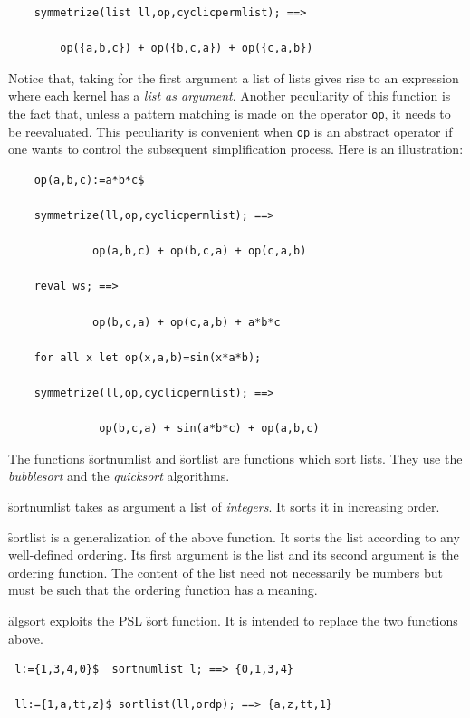 \begin{itemize}
\begin{verbatim}
    symmetrize(list ll,op,cyclicpermlist); ==>

        op({a,b,c}) + op({b,c,a}) + op({c,a,b})
\end{verbatim}
Notice that, taking for the first argument a list of lists gives rise to
an expression where  each kernel has a \emph{list as argument}. Another
peculiarity of this function is the fact that, unless a pattern matching is
made on the operator \texttt{op}, it needs to be reevaluated. This peculiarity
is convenient when \texttt{op} is an abstract operator if one wants to
control the subsequent simplification process. Here is an illustration:
\begin{verbatim}
    op(a,b,c):=a*b*c$

    symmetrize(ll,op,cyclicpermlist); ==>

             op(a,b,c) + op(b,c,a) + op(c,a,b)

    reval ws; ==>

             op(b,c,a) + op(c,a,b) + a*b*c

    for all x let op(x,a,b)=sin(x*a*b);

    symmetrize(ll,op,cyclicpermlist); ==>

              op(b,c,a) + sin(a*b*c) + op(a,b,c)
\end{verbatim}
\hypertarget{operator:SORTNUMLIST}{}
\hypertarget{operator:SORTLIST}{}
The functions \f{sortnumlist} and \f{sortlist} are functions which sort
lists. They use the \emph{bubblesort} and the \emph{quicksort} algorithms.

\f{sortnumlist} takes as argument a list of \emph{integers}. It sorts it in
increasing order.

\f{sortlist} is a generalization of the above function.
It sorts the list according
to any well-defined ordering. Its first argument is the list and its
second argument is the ordering function. The content of the list
need not necessarily be numbers but must be such that the ordering function
has a meaning.

%
%
\hypertarget{operator:ALGSORT}{}%
\f{algsort} exploits the PSL \f{sort} function. It is intended to replace
the two functions above.
\begin{verbatim}
 l:={1,3,4,0}$  sortnumlist l; ==> {0,1,3,4}

 ll:={1,a,tt,z}$ sortlist(ll,ordp); ==> {a,z,tt,1}


\end{verbatim}
\end{itemize}
